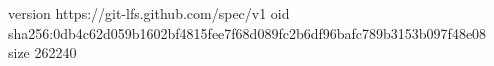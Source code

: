 version https://git-lfs.github.com/spec/v1
oid sha256:0db4c62d059b1602bf4815fee7f68d089fc2b6df96bafc789b3153b097f48e08
size 262240
